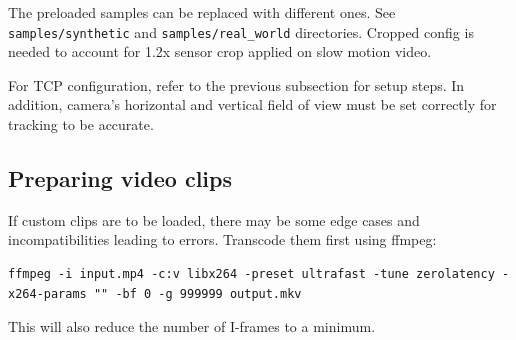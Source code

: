 \documentclass[11pt,english]{report}
\begin{document}
The preloaded samples can be replaced with different ones. See \texttt{samples/synthetic} and \texttt{samples/real\_world} directories. Cropped config is needed to account for 1.2x sensor crop applied on slow motion video.

For TCP configuration, refer to the previous subsection for setup steps. In addition, camera's horizontal and vertical field of view must be set correctly for tracking to be accurate.

\subsection*{Preparing video clips}

If custom clips are to be loaded, there may be some edge cases and incompatibilities leading to errors. Transcode them first using ffmpeg:

\begin{lstlisting}
ffmpeg -i input.mp4 -c:v libx264 -preset ultrafast -tune zerolatency -x264-params "" -bf 0 -g 999999 output.mkv
\end{lstlisting}

This will also reduce the number of I-frames to a minimum.
\end{document}
